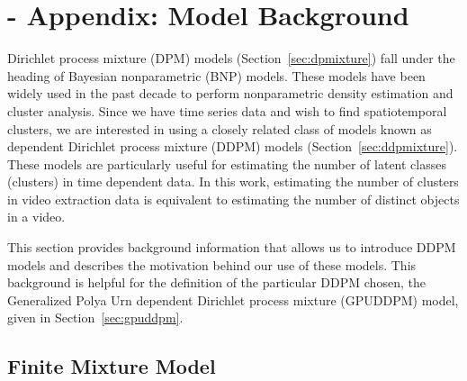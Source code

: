 \documentclass{article}
\begin{document}
\begin{small}

 
\end{small}




\appendix

\section{-  Appendix: Model Background}
\label{sec:modelbackground}

Dirichlet process mixture (DPM) models (Section~\ref{sec:dpmixture}) fall under the heading of Bayesian nonparametric (BNP) models. These models have been widely used in the past decade to perform nonparametric density estimation and cluster analysis. Since we have time series data and wish to find spatiotemporal clusters, we are interested in using a closely related class of models known as dependent Dirichlet process mixture (DDPM) models (Section~\ref{sec:ddpmixture}). These models are particularly useful for estimating the number of latent classes (clusters) in time dependent data. In this work, estimating the number of clusters in video extraction data is equivalent to estimating the number of distinct objects in a video.

This section provides background information that allows us to introduce DDPM models and describes the motivation behind our use of these models. This background is helpful for the definition of the particular DDPM chosen, the Generalized Polya Urn dependent Dirichlet process mixture (GPUDDPM) model, given in Section~\ref{sec:gpuddpm}.


\subsection{Finite Mixture Model}
\label{sec:finitemixture}
\end{document}
